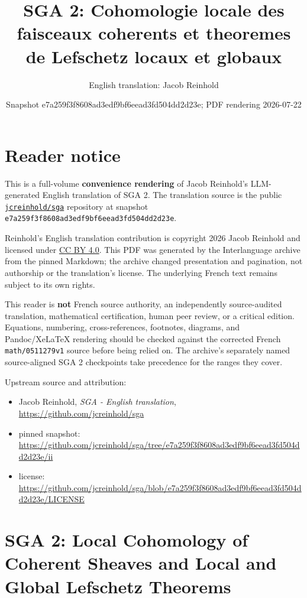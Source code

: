 \documentclass[
  11pt,
  a4paper,
]{book}
\title{SGA 2: Cohomologie locale des faisceaux coherents et theoremes de
Lefschetz locaux et globaux}
\author{English translation: Jacob Reinhold}
\date{Snapshot e7a259f3f8608ad3edf9bf6eead3fd504dd2d23e; PDF rendering
2026-07-22}
\providecommand{\tightlist}{%
  \setlength{\itemsep}{0pt}\setlength{\parskip}{0pt}}
\begin{document}
\pagestyle{plain}
\frontmatter
\maketitle

{
\setcounter{tocdepth}{0}
\tableofcontents
}
\mainmatter
\chapter{Reader notice}\label{reader-notice}

This is a full-volume \textbf{convenience rendering} of Jacob Reinhold's
LLM-generated English translation of SGA 2. The translation source is
the public
\href{https://github.com/jcreinhold/sga}{\texttt{jcreinhold/sga}}
repository at snapshot
\texttt{e7a259f3f8608ad3edf9bf6eead3fd504dd2d23e}.

Reinhold's English translation contribution is copyright 2026 Jacob
Reinhold and licensed under
\href{https://creativecommons.org/licenses/by/4.0/}{CC BY 4.0}. This PDF
was generated by the Interlanguage archive from the pinned Markdown; the
archive changed presentation and pagination, not authorship or the
translation's license. The underlying French text remains subject to its
own rights.

This reader is \textbf{not} French source authority, an independently
source-audited translation, mathematical certification, human peer
review, or a critical edition. Equations, numbering, cross-references,
footnotes, diagrams, and Pandoc/XeLaTeX rendering should be checked
against the corrected French \texttt{math/0511279v1} source before being
relied on. The archive's separately named source-aligned SGA 2
checkpoints take precedence for the ranges they cover.

Upstream source and attribution:

\begin{itemize}
\tightlist
\item
  Jacob Reinhold, \emph{SGA - English translation},
  \url{https://github.com/jcreinhold/sga}
\item
  pinned snapshot:
  \url{https://github.com/jcreinhold/sga/tree/e7a259f3f8608ad3edf9bf6eead3fd504dd2d23e/ii}
\item
  license:
  \url{https://github.com/jcreinhold/sga/blob/e7a259f3f8608ad3edf9bf6eead3fd504dd2d23e/LICENSE}
\end{itemize}

\chapter{SGA 2: Local Cohomology of Coherent Sheaves and Local and
Global Lefschetz
Theorems}\label{sga-2-local-cohomology-of-coherent-sheaves-and-local-and-global-lefschetz-theorems}
\end{document}
